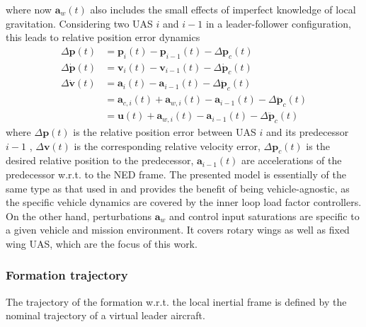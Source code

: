 \documentclass{ifacconf}
\providecommand{\mbf}[1]{\mathbf{#1}}
\newcommand{\idxFollower}{{\ensuremath{i} }}
\newcommand{\idxPredecessor}{{\ensuremath{i-1} }}
\begin{document}
where now $\mbf{a}_w(t)$ also includes the small effects of imperfect knowledge of local gravitation. 
Considering two UAS \idxFollower  and \idxPredecessor in a leader-follower configuration, this leads to relative position error dynamics
\begin{align}
\Delta \mbf{p}(t) &= \mbf{p}_\idxFollower(t) - \mbf{p}_\idxPredecessor(t) - \Delta \mbf{p}_c(t) \\
\Delta \dot{\mbf{p}}(t) &= \mbf{v}_{\idxFollower}(t) - \mbf{v}_{\idxPredecessor}(t) -  \Delta \dot{\mbf{p}}_c(t) \\
\Delta \dot{\mbf{v}}(t) &= \mbf{a}_\idxFollower(t) - \mbf{a}_\idxPredecessor(t) -  \Delta \ddot{\mbf{p}}_c(t)\\
{} &= \mbf{a}_{c,\idxFollower}(t) + \mbf{a}_{w,\idxFollower}(t)
 - \mbf{a}_\idxPredecessor(t) -  \Delta \ddot{\mbf{p}}_c(t)\\
{} &= \mbf{u}(t) + \mbf{a}_{w,\idxFollower}(t)
 - \mbf{a}_\idxPredecessor(t) -  \Delta \ddot{\mbf{p}}_c(t)
\end{align}
where $\Delta \mbf{p}(t)$ is the relative position error between UAS \idxFollower and its predecessor \idxPredecessor, $\Delta \mbf{v}(t)$ is the corresponding relative velocity error, $\Delta \mbf{p}_c(t)$ is the desired relative position to the predecessor, $\mbf{a}_\idxPredecessor(t)$ are accelerations of the predecessor w.r.t. to the NED frame.
The presented model is essentially of the same type as that used in  \cite{galzi2006uav} and provides the benefit of being vehicle-agnostic, as the specific vehicle dynamics are covered by the inner loop load factor controllers. On the other hand, perturbations $\mbf{a}_w$ and control input saturations are specific to a given vehicle and mission environment. It covers rotary wings as well as fixed wing UAS, which are the focus of this work.
\subsubsection{\textbf{Formation trajectory}}
The trajectory of the formation w.r.t. the local inertial frame is defined by the nominal trajectory of a virtual leader aircraft.
\end{document}
